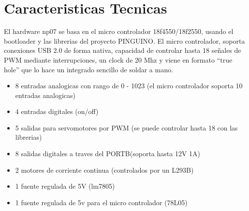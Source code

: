 

\chapter{Caracteristicas Tecnicas}

	El hardware np07 se basa en el micro controlador 18f4550/18f2550, usando el bootloader y las librerias del proyecto PINGUINO. El micro controlador, soporta conexiones USB 2.0 de forma nativa, capacidad de controlar hasta 18 señales de PWM mediante interrupciones, un clock de 20 Mhz y viene en formato “true hole” que lo hace un integrado sencillo de soldar a mano.

\begin{itemize}
	\item 8 entradas analogicas con rango de 0 - 1023 (el micro controlador soporta 10 entradas analogicas)
	\item 4 entradas digitales (on/off)
	\item 5 salidas para servomotores por PWM (se puede controlar hasta 18 con las librerias)
	\item 8 salidas digitales a traves del PORTB(soporta hasta 12V 1A)
	\item 2 motores de corriente continua (controlados por un L293B)
	\item 1 fuente regulada de 5V (lm7805)
	\item 1 fuente regulada de 5v para el micro controlador (78L05)	
	
\end{itemize}